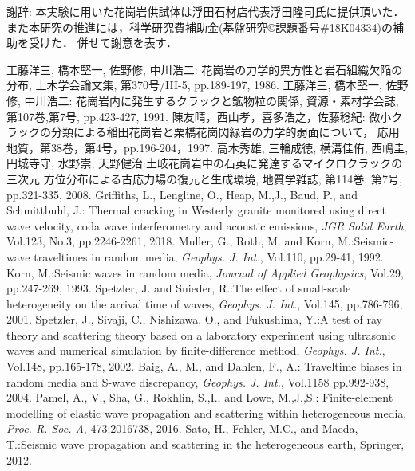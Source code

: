 \documentclass{jsce}
\begin{document}
{\gt 謝辞:}
本実験に用いた花崗岩供試体は浮田石材店代表浮田隆司氏に提供頂いた．
また本研究の推進には，科学研究費補助金(基盤研究©課題番号\#18K04334)の補助を受けた．
併せて謝意を表す．
\begin{thebibliography}{99}
\begin{spacing}{1.175}
	工藤洋三, 橋本堅一, 佐野修, 中川浩二: 花崗岩の力学的異方性と岩石組織欠陥の分布,
	土木学会論文集, 第370号/III-5, pp.189-197, 1986.
	工藤洋三, 橋本堅一, 佐野修, 中川浩二: 花崗岩内に発生するクラックと鉱物粒の関係,
	資源・素材学会誌, 第107巻,第7号, pp.423-427, 1991.
	陳友晴，西山孝，喜多浩之，佐藤稔紀: 微小クラックの分類による稲田花崗岩と栗橋花崗閃緑岩の力学的弱面について，
	応用地質，第38巻，第4号，pp.196-204，1997.
	高木秀雄, 三輪成徳, 横溝佳侑, 西嶋圭, 円城寺守, 水野崇, 天野健治:土岐花崗岩中の石英に発達するマイクロクラックの三次元
	方位分布による古応力場の復元と生成環境, 地質学雑誌, 第114巻, 第7号, pp.321-335, 2008.
	Griffiths, L., Lengline, O., Heap, M.,J., Baud, P., and Schmittbuhl, J.: Thermal cracking in Westerly granite monitored
	using direct wave velocity, coda wave interferometry and acoustic emissions, {\it JGR Solid Earth}, Vol.123, No.3, pp.2246-2261, 2018.
	Muller, G., Roth, M. and Korn, M.:Seismic-wave traveltimes in random media,
	{\it Geophys. J. Int.}, Vol.110, pp.29-41, 1992. 
	Korn, M.:Seismic waves in random media, 
	{\it Journal of Applied Geophysics}, Vol.29, pp.247-269, 1993.
	Spetzler, J. and Snieder, R.:The effect of small-scale heterogeneity on the arrival time of waves, 
	{\it Geophys. J. Int.}, Vol.145, pp.786-796, 2001. 
	Spetzler, J., Sivaji, C., Nishizawa, O., and Fukushima, Y.:A test of ray theory and scattering theory based on
	a laboratory experiment using ultrasonic waves and numerical simulation by finite-difference method, 
	{\it Geophys. J. Int.}, Vol.148, pp.165-178, 2002. 
	Baig, A., M., and Dahlen, F., A.: Traveltime biases in random media and S-wave discrepancy, 
	{\it Geophys. J. Int.}, Vol.1158 pp.992-938, 2004. 
	Pamel, A., V., Sha, G., Rokhlin, S.,I., and Lowe, M.,J.,S.: 
	Finite-element modelling of elastic wave propagation and scattering within heterogeneous media, 
	{\it Proc. R. Soc. A}, 473:2016738, 2016.
	Sato, H., Fehler, M.C., and Maeda, T.:Seismic wave propagation and scattering in the heterogeneous earth, 
	Springer, 2012.


\end{spacing}
\end{thebibliography}
\end{document}
